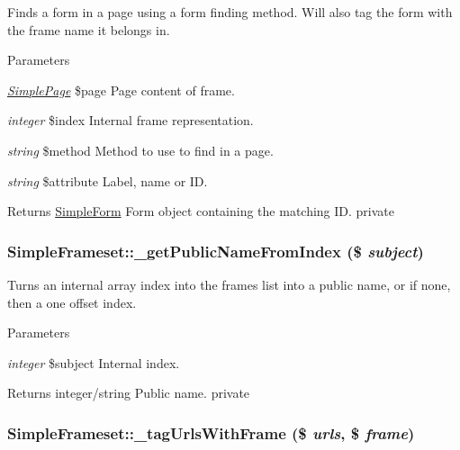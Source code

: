 \label{class_simple_frameset_a83c33da7a10c95c885d6ed02ccd249ac}
Finds a form in a page using a form finding method. Will also tag the form with the frame name it belongs in. 
\begin{DoxyParams}{Parameters}
\item[{\em \hyperlink{class_simple_page}{SimplePage}}]\$page Page content of frame. \item[{\em integer}]\$index Internal frame representation. \item[{\em string}]\$method Method to use to find in a page. \item[{\em string}]\$attribute Label, name or ID. \end{DoxyParams}
\begin{DoxyReturn}{Returns}
\hyperlink{class_simple_form}{SimpleForm} Form object containing the matching ID.  private 
\end{DoxyReturn}
\hypertarget{class_simple_frameset_a9c1ad28fd90f2066cfd5b029a5ea12d5}{
\subsubsection[{\_\-getPublicNameFromIndex}]{\setlength{\rightskip}{0pt plus 5cm}SimpleFrameset::\_\-getPublicNameFromIndex (\$ {\em subject})}}
\label{class_simple_frameset_a9c1ad28fd90f2066cfd5b029a5ea12d5}
Turns an internal array index into the frames list into a public name, or if none, then a one offset index. 
\begin{DoxyParams}{Parameters}
\item[{\em integer}]\$subject Internal index. \end{DoxyParams}
\begin{DoxyReturn}{Returns}
integer/string Public name.  private 
\end{DoxyReturn}
\hypertarget{class_simple_frameset_a24b046fe5f0522337963d458eb9bc966}{
\subsubsection[{\_\-tagUrlsWithFrame}]{\setlength{\rightskip}{0pt plus 5cm}SimpleFrameset::\_\-tagUrlsWithFrame (\$ {\em urls}, \/  \$ {\em frame})}}
